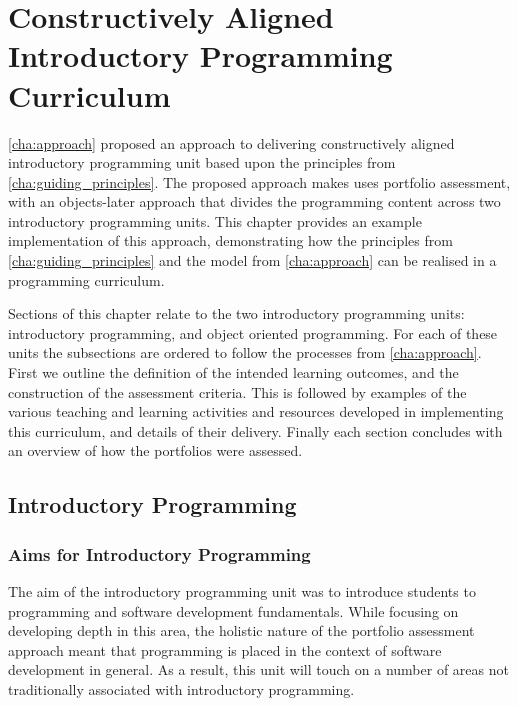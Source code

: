 
\chapter{Constructively Aligned Introductory Programming Curriculum} %
\label{cha:example_impl}

\graphicspath{{Figures/CAIntroProg/}}

\cref{cha:approach} proposed an approach to delivering constructively aligned introductory programming unit based upon the principles from \cref{cha:guiding_principles}. The proposed approach makes uses portfolio assessment, with an objects-later approach that divides the programming content across two introductory programming units. This chapter provides an example implementation of this approach, demonstrating how the principles from \cref{cha:guiding_principles} and the model from \cref{cha:approach} can be realised in a programming curriculum.

Sections of this chapter relate to the two introductory programming units: introductory programming, and object oriented programming. For each of these units the subsections are ordered to follow the processes from \cref{cha:approach}. First we outline the definition of the intended learning outcomes, and the construction of the assessment criteria. This is followed by examples of the various teaching and learning activities and resources developed in implementing this curriculum, and details of their delivery. Finally each section concludes with an overview of how the portfolios were assessed.


\section{Introductory Programming} %
\label{sec:introductory_programming}

\subsection{Aims for Introductory Programming} %
\label{ssub:intro:aims}

The aim of the introductory programming unit was to introduce students to programming and software development fundamentals. While focusing on developing depth in this area, the holistic nature of the portfolio assessment approach meant that programming is placed in the context of software development in general. As a result, this unit will touch on a number of areas not traditionally associated with introductory programming.

